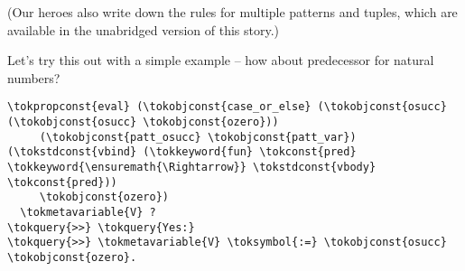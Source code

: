 \begin{scenecomment}
(Our heroes also write down the rules for multiple patterns and tuples, which are
available in the unabridged version of this story.)
\end{scenecomment}

\heroSTUDENT{} Let's try this out with a simple example -- how about
predecessor for natural numbers?

\begin{verbatim}
\tokpropconst{eval} (\tokobjconst{case_or_else} (\tokobjconst{osucc} (\tokobjconst{osucc} \tokobjconst{ozero}))
     (\tokobjconst{patt_osucc} \tokobjconst{patt_var}) (\tokstdconst{vbind} (\tokkeyword{fun} \tokconst{pred} \tokkeyword{\ensuremath{\Rightarrow}} \tokstdconst{vbody} \tokconst{pred}))
     \tokobjconst{ozero})
  \tokmetavariable{V} ?
\tokquery{>>} \tokquery{Yes:}
\tokquery{>>} \tokmetavariable{V} \toksymbol{:=} \tokobjconst{osucc} \tokobjconst{ozero}.
\end{verbatim}

